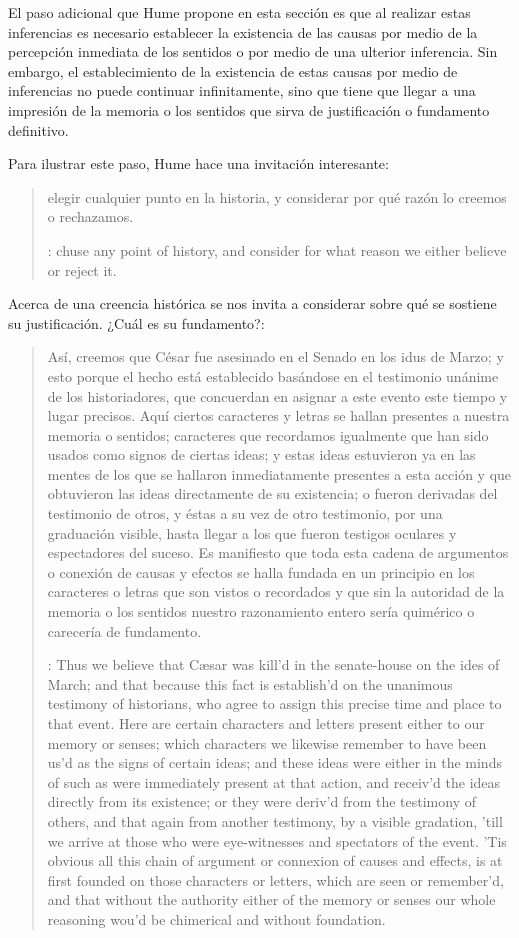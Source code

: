 El paso adicional que Hume propone en esta sección es que al realizar estas
inferencias es necesario establecer la existencia de las causas por medio de la
percepción inmediata de los sentidos o por medio de una ulterior inferencia. Sin
embargo, el establecimiento de la existencia de estas causas por medio de
inferencias no puede continuar infinitamente, sino que tiene que llegar a una
impresión de la memoria o los sentidos que sirva de justificación o fundamento
definitivo.

Para ilustrar este paso, Hume hace una invitación interesante:
  \blockquote[{\cite[?]{humetreatise}}: chuse any point of history, and consider
  for what reason we either believe or reject it.]{elegir cualquier punto en la
    historia, y considerar por qué razón lo creemos o rechazamos.} Acerca de una
  creencia histórica se nos invita a considerar sobre qué se sostiene su
  justificación. ¿Cuál es su fundamento?:
  \blockquote[{\cite[?]{humetratise}}: Thus we believe that Cæsar was kill’d in
  the senate-house on the ides of March; and that because this fact is establish’d
  on the unanimous testimony of historians, who agree to assign this precise time
  and place to that event. Here are certain characters and letters present either
  to our memory or senses; which characters we likewise remember to have been us’d
  as the signs of certain ideas; and these ideas were either in the minds of such
  as were immediately present at that action, and receiv’d the ideas directly from
  its existence; or they were deriv’d from the testimony of others, and that again
  from another testimony, by a visible gradation, ’till we arrive at those who
  were eye-witnesses and spectators of the event. ’Tis obvious all this chain of
  argument or connexion of causes and effects, is at first founded on those
  characters or letters, which are seen or remember’d, and that without the
  authority either of the memory or senses our whole reasoning wou’d be chimerical
  and without foundation.]{Así, creemos que César fue asesinado en el Senado en
    los idus de Marzo; y esto porque el hecho está establecido basándose en el
    testimonio unánime de los historiadores, que concuerdan en asignar a este
    evento este tiempo y lugar precisos. Aquí ciertos caracteres y letras se
    hallan presentes a nuestra memoria o sentidos; caracteres que recordamos
    igualmente que han sido usados como signos de ciertas ideas; y estas ideas
    estuvieron ya en las mentes de los que se hallaron inmediatamente presentes a
    esta acción y que obtuvieron las ideas directamente de su existencia; o fueron
    derivadas del testimonio de otros, y éstas a su vez de otro testimonio, por
    una graduación visible, hasta llegar a los que fueron testigos oculares y
    espectadores del suceso. Es manifiesto que toda esta cadena de argumentos o
    conexión de causas y efectos se halla fundada en un principio en los
    caracteres o letras que son vistos o recordados y que sin la autoridad de la
    memoria o los sentidos nuestro razonamiento entero sería quimérico o carecería
    de fundamento.}

